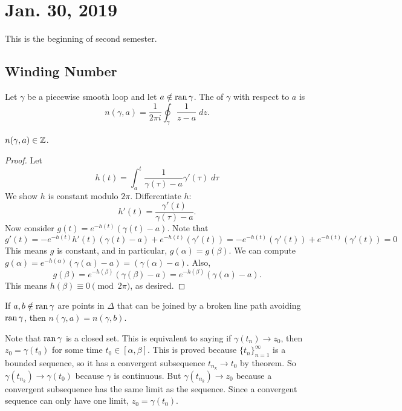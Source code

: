 \documentclass[notes]{subfile}
\begin{document}
\section{Jan. 30, 2019}
This is the beginning of second semester.

\subsection{Winding Number}

\begin{definition}
    Let $\gamma$ be a piecewise smooth loop and let
    $a \notin \operatorname{ran}{\gamma}$.
    The  of $\gamma$ with respect to $a$ is
    \[ n(\gamma, a) = \frac{1}{2\pi i} \oint_{\gamma} \frac{1}{z-a} \; dz. \]
\end{definition}

\begin{theorem}
    $n(\gamma, a) \in \operatorname{\mathbb{Z}}$.
\end{theorem}

\begin{proof}
    Let
    \[ h(t) = \int_a^t \frac{1}{\gamma(\tau)-a}\gamma'(\tau) \; d\tau \]
    We show $h$ is constant modulo $2\pi$.
    Differentiate $h$: 
    \[ h'(t) = \frac{\gamma'(t)}{\gamma(\tau) -a}. \]
    Now consider $g(t) = e^{-h(t)} (\gamma(t) - a)$.
    Note that
    \[ g'(t) = -e^{-h(t)} h'(t) (\gamma(t) - a) + 
        e^{-h(t)} (\gamma'(t))
    = -e^{-h(t)} (\gamma'(t)) +  e^{-h(t)} (\gamma'(t)) = 0 \]
    This means $g$ is constant, and in particular, $g(\alpha) = g(\beta)$.
    We can compute $g(\alpha) = e^{-h(\alpha)} (\gamma(\alpha) - a) = (\gamma(\alpha) - a)$.
    Also, 
    \[ g(\beta) = e^{-h(\beta)}(\gamma(\beta) - a) = e^{-h(\beta)}
    (\gamma(\alpha) - a). \]
    This means $h(\beta) \equiv 0 \pmod{2\pi}$, as desired. 
\end{proof}


\begin{cor}
    If $a,b \notin {\operatorname{ran}} \,  \gamma$ are points in $\Delta$ that can be joined by a broken line path avoiding ${\operatorname{ran}} \, \gamma$, then $n(\gamma, a) = n(\gamma, b)$.
\end{cor}

Note that ${\operatorname{ran}} \, \gamma$ is a closed set.  
This is equivalent to saying if $\gamma (t_n) \to z_0$, then $z_0 = \gamma(t_0)$ for some time $t_0 \in [\alpha, \beta]$.
This is proved because $\{ t_n \}_{n=1}^{\infty}$ is a bounded sequence, so it has a convergent subsequence $t_{n_k} \to t_0$ by  theorem.
So $\gamma(t_{n_k}) \to \gamma(t_0)$ because $\gamma$ is continuous.
But $\gamma(t_{n_k}) \to z_0$ because a convergent subsequence has the same limit as the sequence.
Since a convergent sequence can only have one limit, $z_0 = \gamma(t_0)$.
\end{document}
